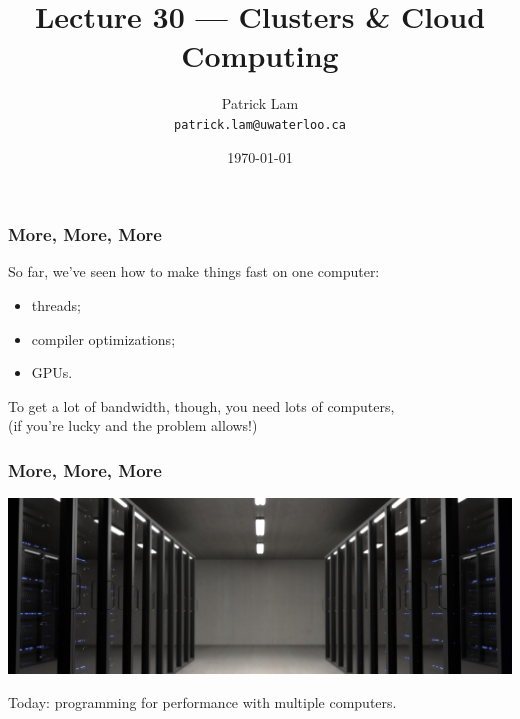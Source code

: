 

\title{Lecture 30 --- Clusters \& Cloud Computing}

\author{Patrick Lam \\ \small \texttt{patrick.lam@uwaterloo.ca}}
\date{\today}




\begin{frame}
  \titlepage

 \end{frame}


\begin{frame}
  \frametitle{More, More, More}

  

  So far, we've seen how to make things fast on one computer:
\begin{itemize}
\item threads;
\item compiler optimizations;
\item GPUs.
\end{itemize}
  To get a lot of bandwidth, though, you need lots of computers, \\
   \qquad (if you're lucky and the problem allows!)\\[1em]
   
\end{frame}


\begin{frame}
  \frametitle{More, More, More}
  
  \begin{center}
	\includegraphics[width= \textwidth]{images/servers.jpeg}
\end{center}

  Today: programming for performance with multiple computers.

  
\end{frame}

